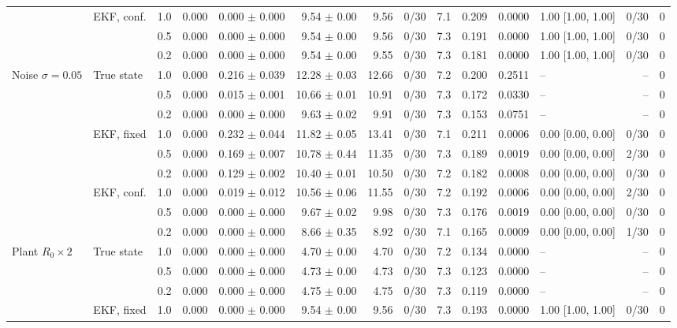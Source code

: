 {\begin{tabular}{llrrrrrrrrrlrr}
\addlinespace
 & EKF, conf. & 1.0 & 0.000 & 0.000 $\pm$ 0.000 & 9.54 $\pm$ 0.00 & 9.56 & 0/30 & 7.1 & 0.209 & 0.0000 & 1.00 [1.00, 1.00] & 0/30 & 0 \\
 &  & 0.5 & 0.000 & 0.000 $\pm$ 0.000 & 9.54 $\pm$ 0.00 & 9.56 & 0/30 & 7.3 & 0.191 & 0.0000 & 1.00 [1.00, 1.00] & 0/30 & 0 \\
 &  & 0.2 & 0.000 & 0.000 $\pm$ 0.000 & 9.54 $\pm$ 0.00 & 9.55 & 0/30 & 7.3 & 0.181 & 0.0000 & 1.00 [1.00, 1.00] & 0/30 & 0 \\
\midrule
Noise $\sigma=0.05$ & True state & 1.0 & 0.000 & 0.216 $\pm$ 0.039 & 12.28 $\pm$ 0.03 & 12.66 & 0/30 & 7.2 & 0.200 & 0.2511 & -- & -- & 0 \\
 &  & 0.5 & 0.000 & 0.015 $\pm$ 0.001 & 10.66 $\pm$ 0.01 & 10.91 & 0/30 & 7.3 & 0.172 & 0.0330 & -- & -- & 0 \\
 &  & 0.2 & 0.000 & 0.000 $\pm$ 0.000 & 9.63 $\pm$ 0.02 & 9.91 & 0/30 & 7.3 & 0.153 & 0.0751 & -- & -- & 0 \\
\addlinespace
 & EKF, fixed & 1.0 & 0.000 & 0.232 $\pm$ 0.044 & 11.82 $\pm$ 0.05 & 13.41 & 0/30 & 7.1 & 0.211 & 0.0006 & 0.00 [0.00, 0.00] & 0/30 & 0 \\
 &  & 0.5 & 0.000 & 0.169 $\pm$ 0.007 & 10.78 $\pm$ 0.44 & 11.35 & 0/30 & 7.3 & 0.189 & 0.0019 & 0.00 [0.00, 0.00] & 2/30 & 0 \\
 &  & 0.2 & 0.000 & 0.129 $\pm$ 0.002 & 10.40 $\pm$ 0.01 & 10.50 & 0/30 & 7.2 & 0.182 & 0.0008 & 0.00 [0.00, 0.00] & 0/30 & 0 \\
\addlinespace
 & EKF, conf. & 1.0 & 0.000 & 0.019 $\pm$ 0.012 & 10.56 $\pm$ 0.06 & 11.55 & 0/30 & 7.2 & 0.192 & 0.0006 & 0.00 [0.00, 0.00] & 2/30 & 0 \\
 &  & 0.5 & 0.000 & 0.000 $\pm$ 0.000 & 9.67 $\pm$ 0.02 & 9.98 & 0/30 & 7.3 & 0.176 & 0.0019 & 0.00 [0.00, 0.00] & 0/30 & 0 \\
 &  & 0.2 & 0.000 & 0.000 $\pm$ 0.000 & 8.66 $\pm$ 0.35 & 8.92 & 0/30 & 7.1 & 0.165 & 0.0009 & 0.00 [0.00, 0.00] & 1/30 & 0 \\
\midrule
Plant $R_0\times2$ & True state & 1.0 & 0.000 & 0.000 $\pm$ 0.000 & 4.70 $\pm$ 0.00 & 4.70 & 0/30 & 7.2 & 0.134 & 0.0000 & -- & -- & 0 \\
 &  & 0.5 & 0.000 & 0.000 $\pm$ 0.000 & 4.73 $\pm$ 0.00 & 4.73 & 0/30 & 7.3 & 0.123 & 0.0000 & -- & -- & 0 \\
 &  & 0.2 & 0.000 & 0.000 $\pm$ 0.000 & 4.75 $\pm$ 0.00 & 4.75 & 0/30 & 7.3 & 0.119 & 0.0000 & -- & -- & 0 \\
\addlinespace
 & EKF, fixed & 1.0 & 0.000 & 0.000 $\pm$ 0.000 & 9.54 $\pm$ 0.00 & 9.56 & 0/30 & 7.3 & 0.193 & 0.0000 & 1.00 [1.00, 1.00] & 0/30 & 0 \\

\end{tabular}}
